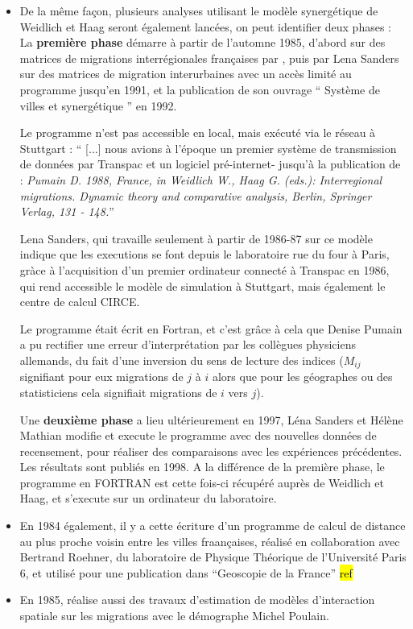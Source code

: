 \begin{itemize}[label=\textbullet]
\item De la même façon, plusieurs analyses utilisant le modèle synergétique de Weidlich et Haag seront également lancées, on peut identifier deux phases : La \textbf{première phase} démarre à partir de l’automne 1985, d’abord sur des matrices de migrations interrégionales françaises par \textcite{Pumain1987}, puis par Lena Sanders sur des matrices de migration interurbaines avec un accès limité au programme jusqu’en 1991, et la publication de son ouvrage \enquote{ Système de villes et synergétique } en 1992.

Le programme n'est pas accessible en local, mais exécuté via le réseau à Stuttgart : \enquote{ [...] nous avions à l’époque un premier système de transmission de données par Transpac et un logiciel pré-internet- jusqu’à la publication de \autocite{Pumain1988} : \textit{Pumain D. 1988, France, in Weidlich W., Haag G. (eds.): Interregional migrations. Dynamic theory and comparative analysis, Berlin, Springer Verlag, 131 - 148.}}

Lena Sanders, qui travaille seulement à partir de 1986-87 sur ce modèle indique que les executions se font depuis le laboratoire rue du four à Paris, gràce à l'acquisition d'un premier ordinateur connecté à Transpac en 1986, qui rend accessible le modèle de simulation à Stuttgart, mais également le centre de calcul CIRCE.

Le programme était écrit en Fortran, et c’est grâce à cela que Denise Pumain a pu rectifier une erreur d’interprétation par les collègues physiciens allemands, du fait d’une inversion du sens de lecture des indices ($M_{ij}$ signifiant pour eux migrations de $j$ à $i$ alors que pour les géographes ou des statisticiens cela signifiait migrations de $i$ vers $j$).

Une \textbf{deuxième phase} a lieu ultérieurement en 1997, Léna Sanders et Hélène Mathian modifie et execute le programme avec des nouvelles données de recensement, pour réaliser des comparaisons avec les expériences précédentes. Les résultats sont publiés en 1998. A la différence de la première phase, le programme en FORTRAN est cette fois-ci récupéré auprès de Weidlich et Haag, et s'execute sur un ordinateur du laboratoire.


\item En 1984 également, il y a cette écriture d’un programme de calcul de distance au plus proche voisin entre les villes fraançaises, réalisé en collaboration avec Bertrand Roehner, du laboratoire de Physique Théorique de l’Université Paris 6, et utilisé pour une publication dans “Geoscopie de la France” \hl{ref}

\item En 1985, \textcite{Pumain1985} réalise aussi des travaux d’estimation de modèles d’interaction spatiale sur les migrations avec le démographe Michel Poulain.

\end{itemize}

